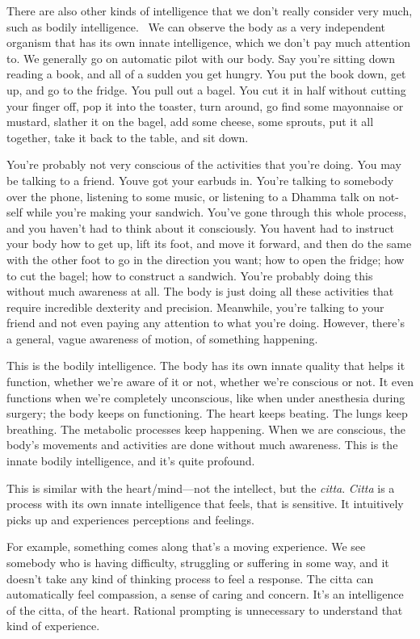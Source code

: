 There are also other kinds of intelligence that we don't really consider very much, such as bodily intelligence.~ We can observe the body as a very independent organism that has its own innate intelligence, which we don't pay much attention to. We generally go on automatic pilot with our body. Say you're sitting down reading a book, and all of a sudden you get hungry. You put the book down, get up, and go to the fridge. You pull out a bagel. You cut it in half without cutting your finger off, pop it into the toaster, turn around, go find some mayonnaise or mustard, slather it on the bagel, add some cheese, some sprouts, put it all together, take it back to the table, and sit down.

You're probably not very conscious of the activities that you're doing. You may be talking to a friend. You\textquotesingle ve got your earbuds in. You're talking to somebody over the phone, listening to some music, or listening to a Dhamma talk on not-self while you're making your sandwich. You've gone through this whole process, and you haven't had to think about it consciously. You haven\textquotesingle t had to instruct your body how to get up, lift its foot, and move it forward, and then do the same with the other foot to go in the direction you want; how to open the fridge; how to cut the bagel; how to construct a sandwich. You're probably doing this without much awareness at all. The body is just doing all these activities that require incredible dexterity and precision. Meanwhile, you're talking to your friend and not even paying any attention to what you're doing. However, there's a general, vague awareness of motion, of something happening.

This is the bodily intelligence. The body has its own innate quality that helps it function, whether we're aware of it or not, whether we're conscious or not. It even functions when we're completely unconscious, like when under anesthesia during surgery; the body keeps on functioning. The heart keeps beating. The lungs keep breathing. The metabolic processes keep happening. When we are conscious, the body's movements and activities are done without much awareness. This is the innate bodily intelligence, and it's quite profound.~

This is similar with the heart/mind---not the intellect, but the \emph{citta}. \emph{Citta} is a process with its own innate intelligence that feels, that is sensitive. It intuitively picks up and experiences perceptions and feelings.

For example, something comes along that's a moving experience. We see somebody who is having difficulty, struggling or suffering in some way, and it doesn't take any kind of thinking process to feel a response. The citta can automatically feel compassion, a sense of caring and concern. It's an intelligence of the citta, of the heart. Rational prompting is unnecessary to understand that kind of experience.~

